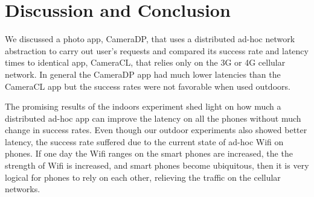 \chapter{Discussion and Conclusion}

We discussed a photo app, CameraDP, that uses a distributed ad-hoc network abstraction to carry out user's requests and compared its success rate and latency times to identical app, CameraCL, that relies only on the 3G or 4G cellular network. In general the CameraDP app had much lower latencies than the CameraCL app but the success rates were not favorable when used outdoors.

The promising results of the indoors experiment shed light on how much a distributed ad-hoc app can improve the latency on all the phones without much change in success rates. Even though our outdoor experiments also showed better latency, the success rate suffered due to the current state of ad-hoc Wifi on phones. If one day the Wifi ranges on the smart phones are increased, the the strength of Wifi is increased, and smart phones become ubiquitous, then it is very logical for phones to rely on each other, relieving the traffic on the cellular networks.
